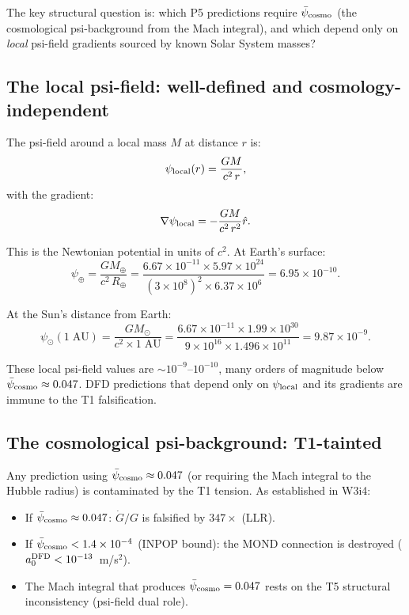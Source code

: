 \documentclass[11pt]{article}
\newcommand{\ee}[1]{\times 10^{#1}}
\newcommand{\psicosmo}{\bar{\psi}_{\rm cosmo}}
\begin{document}
The key structural question is: which P5 predictions require $\psicosmo$
(the cosmological psi-background from the Mach integral), and which depend
only on \emph{local} psi-field gradients sourced by known Solar System masses?

\subsection{The local psi-field: well-defined and cosmology-independent}

The psi-field around a local mass $M$ at distance $r$ is:
\begin{equation}
\psi_{\rm local}(r) = \frac{GM}{c^2\,r},
\label{eq:psi-local}
\end{equation}
with the gradient:
\begin{equation}
\nabla\psi_{\rm local} = -\frac{GM}{c^2\,r^2}\hat{r}.
\label{eq:grad-psi-local}
\end{equation}

This is the Newtonian potential in units of $c^2$. At Earth's surface:
\begin{equation}
\psi_\oplus = \frac{GM_\oplus}{c^2\,R_\oplus}
= \frac{6.67\ee{-11}\times 5.97\ee{24}}{(3\ee{8})^2\times 6.37\ee{6}}
= 6.95\ee{-10}.
\label{eq:psi-Earth}
\end{equation}

At the Sun's distance from Earth:
\begin{equation}
\psi_\odot(1\;\text{AU}) = \frac{GM_\odot}{c^2\times 1\;\text{AU}}
= \frac{6.67\ee{-11}\times 1.99\ee{30}}{9\ee{16}\times 1.496\ee{11}}
= 9.87\ee{-9}.
\label{eq:psi-Sun}
\end{equation}

These local psi-field values are $\sim 10^{-9}$--$10^{-10}$, many orders of
magnitude below $\psicosmo \approx 0.047$. DFD predictions that depend only
on $\psi_{\rm local}$ and its gradients are immune to the T1 falsification.

\subsection{The cosmological psi-background: T1-tainted}

Any prediction using $\psicosmo \approx 0.047$ (or requiring the Mach integral
to the Hubble radius) is contaminated by the T1 tension. As established in
W3i4:
\begin{itemize}
\item If $\psicosmo \approx 0.047$: $\dot{G}/G$ is falsified by $347\times$ (LLR).
\item If $\psicosmo < 1.4\ee{-4}$ (INPOP bound): the MOND connection is destroyed
  ($a_0^{\rm DFD} < 10^{-13}$~m/s$^2$).
\item The Mach integral that produces $\psicosmo = 0.047$ rests on the T5
  structural inconsistency (psi-field dual role).
\end{itemize}
\end{document}
